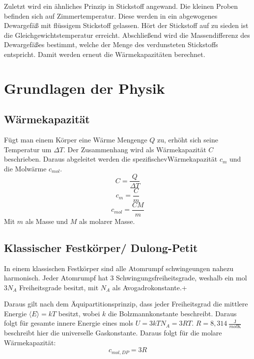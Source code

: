 Zuletzt wird ein ähnliches Prinzip in Stickstoff angewand. Die kleinen Proben befinden sich auf Zimmertemperatur.
Diese werden in ein abgewogenes Dewargefäß mit flüssigem Stickstoff gelassen. Hört der Stickstoff auf zu sieden ist die Gleichgewichtstemperatur erreicht.
Abschließend wird die Massendifferenz des Dewargefäßes bestimmt, welche der Menge des verdunsteten Stickstoffs entspricht.
Damit werden erneut die Wärmekapazitäten berechnet.

\section{Grundlagen der Physik}

\subsection{Wärmekapazität}

Fügt man einem Körper eine Wärme Mengenge $Q$ zu, erhöht sich seine Temperatur um $\Delta T$. Der Zusammenhang wird als Wärmekapazität $C$ beschrieben.
Daraus abgeleitet werden die spezifischevWärmekapazität $c_m$ und die Molwärme $c_{mol}$.
\begin{equation}
    C = \frac{Q}{\Delta T}
\end{equation}
\begin{equation}
    c_m = \frac{C}{m}
\end{equation}
\begin{equation}
    c_{mol} = \frac{CM}{m}
\end{equation}
Mit $m$ als Masse und $M$ als molarer Masse.

\subsection{Klassischer Festkörper/ Dulong-Petit}

In einem klassischen Festkörper sind alle Atomrumpf schwingeungen nahezu harmonisch.
Jeder Atomrumpf hat 3 Schwingungsfreiheitsgrade, weshalb ein mol $3N_A$ Freiheitsgrade besitzt, mit $N_A$ als Avogadrokonstante.+

Daraus gilt nach dem Äquipartitionsprinzip, dass jeder Freiheitsgrad die mittlere Energie $\langle E \rangle = kT$ besitzt, wobei $k$ die Bolzmannkonstante beschreibt. Daraus folgt für
gesamte innere Energie eines mols $U = 3kTN_A = 3RT$. $R = 8,314\ \tfrac{\text{J}}{mol \text{K}}$ beschreibt hier die universelle Gaskonstante.
Daraus folgt für die molare Wärmekapazität:
\begin{equation}
    c_{mol,DP} = 3R
\end{equation}
